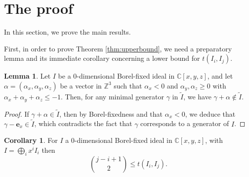 \documentclass[11pt,a4paper,leqno,noamsfonts]{amsart}
\numberwithin{equation}{section}
\newcommand{\BC}{{\mathbb{C}}}
\newcommand{\BZ}{{\mathbb{Z}}}
\theoremstyle{definition}
\theoremstyle{thm}
\newtheorem{corollary}[definition]{Corollary}
\newtheorem{lemma}[definition]{Lemma}
\theoremstyle{ex}
\theoremstyle{sol}
\begin{document}
\section{The proof}\label{Section: proofs} In this section, we prove the main results.

First, in order to prove Theorem \ref{thm:upperbound}, we need a preparatory lemma and its immediate corollary concerning a lower bound for $t(I_i,I_j)$.
\begin{lemma}\label{Lem:bound}
    Let $I$ be a $0$-dimensional Borel-fixed ideal in $\BC[x,y,z]$, and let $\alpha=(\alpha_x,\alpha_y,\alpha_z)$ be a vector in $\BZ^3$ such that $\alpha_x<0$ and $\alpha_y,\alpha_z\geq0$ with $\alpha_x+\alpha_y+\alpha_z\leq-1$. Then, for any minimal generator $\gamma$ in $\tilde{I}$, we have $\gamma+\alpha\notin\tilde{I}$.
\end{lemma}
\begin{proof}
    If $\gamma+\alpha\in\tilde{I}$, then by Borel-fixedness and that $\alpha_x<0$, we deduce that $\gamma-\mathbf{e}_x\in\tilde{I}$, which contradicts the fact that $\gamma$ corresponds to a generator of $I$. 
\end{proof}

\begin{corollary}\label{cor:tlowerbound}
    For $I$ a 0-dimensional Borel-fixed ideal in $\BC[x,y,z]$, with $I=\bigoplus_ix^iI_i$ then
    \[\binom{j-i+1}{2} \leq t(I_i,I_j).\]
\end{corollary}
\end{document}
